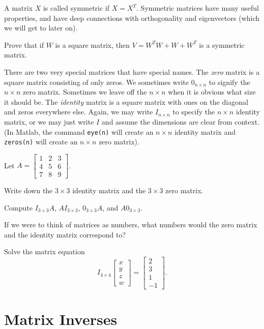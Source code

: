 \documentclass{article}
\newcommand{\mat}[1]{\begin{bmatrix}#1\end{bmatrix}}
\begin{document}
A matrix $X$ is called symmetric if $X=X^T$.  Symmetric matrices have many useful properties,
and have deep connections with orthogonality and eigenvectors (which we will get to later on).

	\begin{Enum}
		\item Prove that if $W$ is a square matrix, then $V=W^TW+W+W^T$ is a symmetric
		matrix.
	\end{Enum}

There are two very special matrices that have special names.  The \emph{zero} matrix
is a square matrix consisting of only zeros.  We sometimes write $0_{n\times n}$
to signify the $n\times n$ zero matrix.  Sometimes we leave off the $n\times n$
when it is obvious what size it should be.  The \emph{identity} matrix is a square
matrix with ones on the diagonal and zeros everywhere else.  Again, we may write
$I_{n\times n}$ to specify the $n\times n$ identity matrix, or we may just write $I$ and
assume the dimensions are clear from context.  (In Matlab, 
the command {\tt eye(n)} will create an $n\times n$ identity
matrix and {\tt zeros(n)} will create an $n\times n$ zero matrix).

	Let $A=\mat{1&2&3\\4&5&6\\7&8&9}$.
	\begin{Enum}
		\item Write down the $3\times 3$ identity matrix and the $3\times 3$ zero
		matrix.
		\item Compute $I_{3\times 3}A$, $AI_{3\times 3}$, $0_{3\times 3}A$,
		and $A0_{3\times 3}$.
		\item If we were to think of matrices as numbers, what numbers would the
		zero matrix and the identity matrix correspond to?
	\end{Enum}
	\begin{Enum}
		\item Solve the matrix equation
		\[
			I_{4\times 4}\mat{x\\y\\z\\w} = \mat{2\\3\\1\\-1}.
		\]
	\end{Enum}

\newpage
\section*{Matrix Inverses}
\end{document}
